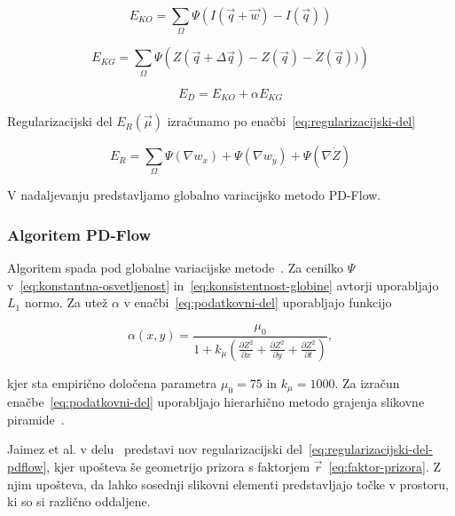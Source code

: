 \begin{equation}\label{eq:konstantna-osvetljenost}
	E_{KO} = \sum_\Omega \Psi( I(\vec{q} + \vec{w}) - I(\vec{q}))
\end{equation}

\begin{equation}\label{eq:konsistentnost-globine}
	E_{KG} = \sum_\Omega \Psi\left( Z(\vec{q} + \Delta \vec{q}) - Z(\vec{q}) - \dot{Z}(\vec{q}))\right)
\end{equation}

\begin{equation}\label{eq:podatkovni-del}
	E_D = E_{KO} + \alpha E_{KG}
\end{equation}

Regularizacijski del $E_R(\vec{\mu})$ izračunamo po enačbi~\eqref{eq:regularizacijski-del}

\begin{equation}\label{eq:regularizacijski-del}
	E_R = \sum_\Omega \Psi\left( \nabla w_x \right) + \Psi\left( \nabla w_y \right) + \Psi\left( \nabla \dot{Z} \right)
\end{equation}

V nadaljevanju predstavljamo globalno variacijsko metodo PD-Flow.


\subsubsection{Algoritem PD-Flow}\label{sec:pd-flow}
Algoritem spada pod globalne variacijske metode~\cite{jaimez2015primal}. Za cenilko $\Psi$ v~\eqref{eq:konstantna-osvetljenost} in~\eqref{eq:konsistentnost-globine} avtorji uporabljajo $L_1$ normo. Za utež $\alpha$ v enačbi~\eqref{eq:podatkovni-del} uporabljajo funkcijo 

\begin{equation}\label{eq:utez}
 \alpha(x,y) = \frac{\mu_0}{1 + k_\mu \left( \frac{\partial Z^2}{\partial x} + \frac{\partial Z^2}{\partial y} + \frac{\partial Z^2}{\partial t} \right)},
\end{equation}

kjer sta empirično določena parametra $\mu_0 = 75$ in $k_\mu = 1000$. Za izračun enačbe~\eqref{eq:podatkovni-del} uporabljajo hierarhično metodo grajenja slikovne piramide~\cite{jaimez2015primal}.

Jaimez et al. v delu~\cite{jaimez2015primal} predstavi nov regularizacijski del~\eqref{eq:regularizacijski-del-pdflow}, kjer upošteva še geometrijo prizora s faktorjem $\vec{r}$~\eqref{eq:faktor-prizora}. Z njim upošteva, da lahko sosednji slikovni elementi predstavljajo točke v prostoru, ki so si različno oddaljene.

